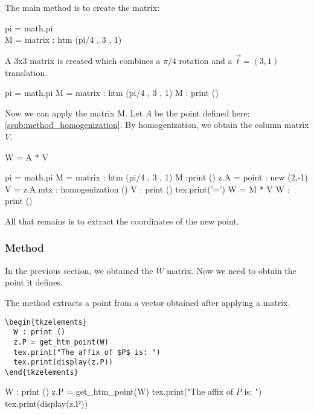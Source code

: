 The main method is to create the matrix:

\begin{mybox}
  pi  = math.pi\\
  M   = matrix : htm (pi/4 , 3 , 1)
\end{mybox}

A 3x3 matrix is created which combines a $\pi/4$ rotation and a $\overrightarrow{t}=(3,1)$ translation.

\begin{tkzelements}
  pi  = math.pi
  M   = matrix : htm (pi/4 , 3 , 1)
  M : print ()
\end{tkzelements}


Now we can apply the matrix M. Let $A$ be the point defined here: \ref{ssub:method_homogenization}. By homogenization, we obtain the column matrix $V$.


\begin{mybox}
W = A * V
\end{mybox}

\begin{tkzelements}
pi  = math.pi
M   = matrix : htm (pi/4 , 3 , 1)
M :print ()
z.A = point : new (2,-1)
V = z.A.mtx : homogenization () 
V : print () tex.print('=')
W = M * V
W : print ()
\end{tkzelements}

All that remains is to extract the coordinates of the new point.

\subsubsection{Method } %
\label{ssub:method_code_get__htm__point}

In the previous section, we obtained the $W$ matrix. Now we need to obtain the point it defines. 

The  method   extracts a point from a vector obtained after applying a  matrix.

\begin{minipage}{.5\textwidth}
\begin{verbatim}
\begin{tkzelements}
  W : print ()
  z.P = get_htm_point(W)
  tex.print("The affix of $P$ is: ")
  tex.print(display(z.P))
\end{tkzelements}
\end{verbatim}
\end{minipage}
\begin{minipage}{.5\textwidth}
\begin{tkzelements}
  W : print ()
  z.P = get_htm_point(W)
  tex.print("The affix of $P$ is: ")
  tex.print(display(z.P))
\end{tkzelements}
\end{minipage}


